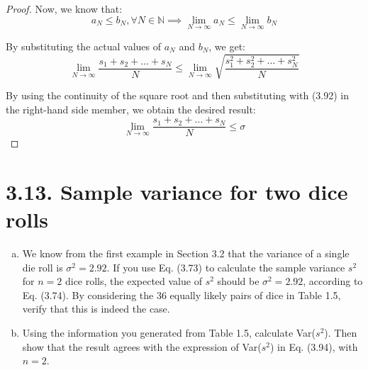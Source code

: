 \begin{proof}
    Now, we know that:
    \[
        a_N \leq b_N, \forall N \in \mathbb{N} \implies \lim_{N \to \infty} a_N \leq \lim_{N \to \infty} b_N
    \] 

    By substituting the actual values of $a_N$ and $b_N$, we get:
    \[
        \lim_{N \to \infty} \frac{s_1 + s_2 + \ldots + s_N}{N}
        \leq \lim_{N \to \infty} \sqrt{\frac{s_1^2 + s_2^2 + \ldots + s_N^2}{N}} 
    \] 

    By using the continuity of the square root and then substituting with (3.92) in the
    right-hand side member, we obtain the desired result:
    \begin{equation*}\tag{3.93}
        \lim_{N \to \infty} \frac{s_1 + s_2 + \ldots + s_N}{N} \leq \sigma
    \end{equation*}
\end{proof}

\section*{3.13. Sample variance for two dice rolls}
\begin{enumerate}[(a)]
    \item We know from the first example in Section 3.2 that the variance of a
        single die roll is $\sigma^2 = 2.92$. If you use Eq. (3.73) to
        calculate the sample variance  $s^2$ for $n = 2$ dice rolls,
        the expected value of $s^2$ should be $\sigma^2 = 2.92$,
        according to Eq. (3.74). By considering the 36 equally
        likely pairs of dice in Table 1.5, verify that this is indeed the case.

    \item Using the information you generated from Table 1.5, calculate Var($s^2$).
        Then show that the result agrees with the expression of Var($s^2$) in
        Eq. (3.94), with $n = 2$.
\end{enumerate}

\vspace{1em}

